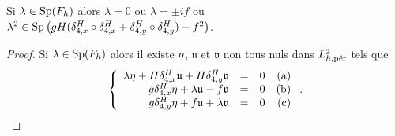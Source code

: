 \begin{proposition}
Si $\lambda \in \Sp(F_h)$ alors $\lambda = 0$ ou $\lambda = \pm i f$ ou $\lambda^2 \in \Sp \left( gH (\delta_{4,x}^H \circ \delta_{4,x}^H + \delta_{4,y}^H \circ \delta_{4,y}^H) - f^2 \right)$.
\label{prop:spectre_F_h}
\end{proposition}

\begin{proof}
Si $\lambda \in \Sp(F_h)$ alors il existe $\etafrak$, $\mathfrak{u}$ et $\mathfrak{v}$ non tous nuls dans $L^2_{h,\per}$ tels que
\begin{equation}
\left\lbrace
\begin{array}{rclr}
\lambda \etafrak + H \delta_{4,x}^H \mathfrak{u} + H \delta_{4,y}^H \mathfrak{v} & = & 0 & \text{(a)}\\
g \delta_{4,x}^H \etafrak + \lambda \mathfrak{u} - f \mathfrak{v} & = & 0 & \text{(b)} \\
g \delta_{4,y}^H \etafrak + f \mathfrak{u} + \lambda \mathfrak{v} & = & 0 & \text{(c)}
\end{array}
\right. .
\label{eq:preuve_stab1}
\end{equation}


\end{proof}
